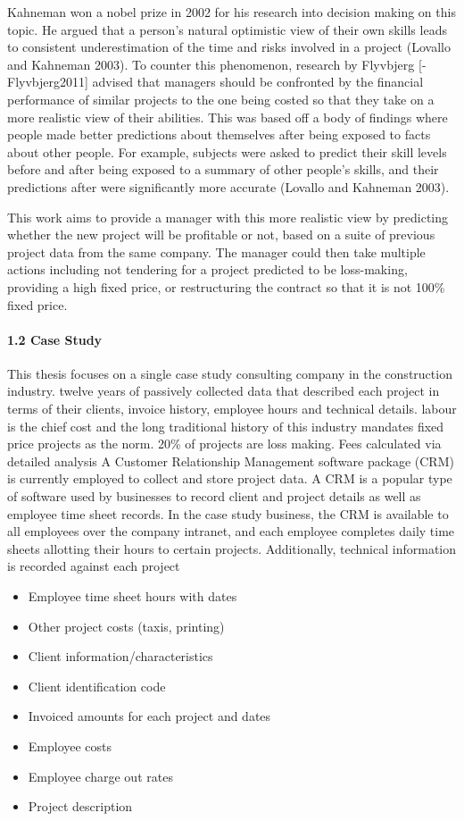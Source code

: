 \documentclass[]{elsarticle} %
\providecommand{\tightlist}{%
  \setlength{\itemsep}{0pt}\setlength{\parskip}{0pt}}
\begin{document}
Kahneman won a nobel prize in 2002 for his research into decision making
on this topic. He argued that a person's natural optimistic view of
their own skills leads to consistent underestimation of the time and
risks involved in a project (Lovallo and Kahneman 2003). To counter this
phenomenon, research by Flyvbjerg {[}-Flyvbjerg2011{]} advised that
managers should be confronted by the financial performance of similar
projects to the one being costed so that they take on a more realistic
view of their abilities. This was based off a body of findings where
people made better predictions about themselves after being exposed to
facts about other people. For example, subjects were asked to predict
their skill levels before and after being exposed to a summary of other
people's skills, and their predictions after were significantly more
accurate (Lovallo and Kahneman 2003).

This work aims to provide a manager with this more realistic view by
predicting whether the new project will be profitable or not, based on a
suite of previous project data from the same company. The manager could
then take multiple actions including not tendering for a project
predicted to be loss-making, providing a high fixed price, or
restructuring the contract so that it is not 100\% fixed price.

\paragraph{1.2 Case Study}\label{case-study}

This thesis focuses on a single case study consulting company in the
construction industry. twelve years of passively collected data that
described each project in terms of their clients, invoice history,
employee hours and technical details. labour is the chief cost and the
long traditional history of this industry mandates fixed price projects
as the norm. 20\% of projects are loss making. Fees calculated via
detailed analysis A Customer Relationship Management software package
(CRM) is currently employed to collect and store project data. A CRM is
a popular type of software used by businesses to record client and
project details as well as employee time sheet records. In the case
study business, the CRM is available to all employees over the company
intranet, and each employee completes daily time sheets allotting their
hours to certain projects. Additionally, technical information is
recorded against each project

\begin{itemize}
\tightlist
\item
  Employee time sheet hours with dates
\item
  Other project costs (taxis, printing)
\item
  Client information/characteristics
\item
  Client identification code
\item
  Invoiced amounts for each project and dates
\item
  Employee costs
\item
  Employee charge out rates
\item
  Project description
\end{itemize}
\end{document}
